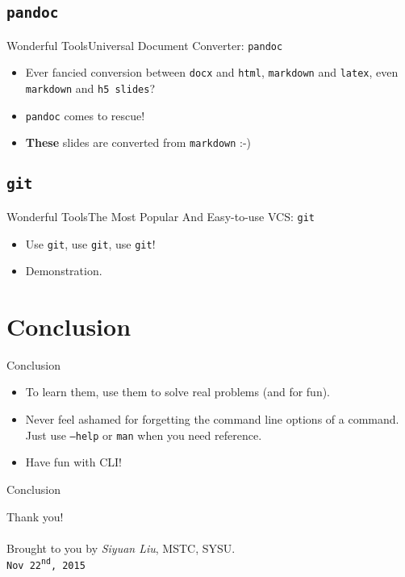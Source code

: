 \documentclass[aspectratio=169]{beamer}
\begin{document}
\subsection{\tt pandoc}
\begin{frame}{Wonderful Tools}{Universal Document Converter: \texttt{pandoc}}

\begin{itemize}[<+->]
\item
  Ever fancied conversion between \texttt{docx} and \texttt{html},
  \texttt{markdown} and \texttt{latex}, even \texttt{markdown} and
  \texttt{h5\ slides}?
\item
  \texttt{pandoc} comes to rescue!
\item
  \textbf{These} slides are converted from \texttt{markdown} :-)
\end{itemize}

\end{frame}

\subsection{\tt git}
\begin{frame}{Wonderful Tools}{The Most Popular And Easy-to-use VCS: \texttt{git}}

\begin{itemize}[<+->]
\item
  Use \texttt{git}, use \texttt{git}, use \texttt{git}!
\item
  Demonstration.
\end{itemize}

\end{frame}

\section{Conclusion}\label{conslusion}

\begin{frame}{Conclusion}

\begin{itemize}[<+->]
\item
  To learn them, use them to solve real problems (and for fun).
\item
  Never feel ashamed for forgetting the command line options of a command.
  Just use \texttt{--help} or \texttt{man} when you need reference.
\item
  Have fun with CLI!
\end{itemize}

\end{frame}

\begin{frame}{Conclusion}

    \begin{center}
        {\LARGE Thank you!}\\
        ~\\
        Brought to you by \emph{Siyuan Liu}, MSTC, SYSU.\\
        {\tt Nov 22\textsuperscript{nd}, 2015}
    \end{center}

\end{frame}
\end{document}

